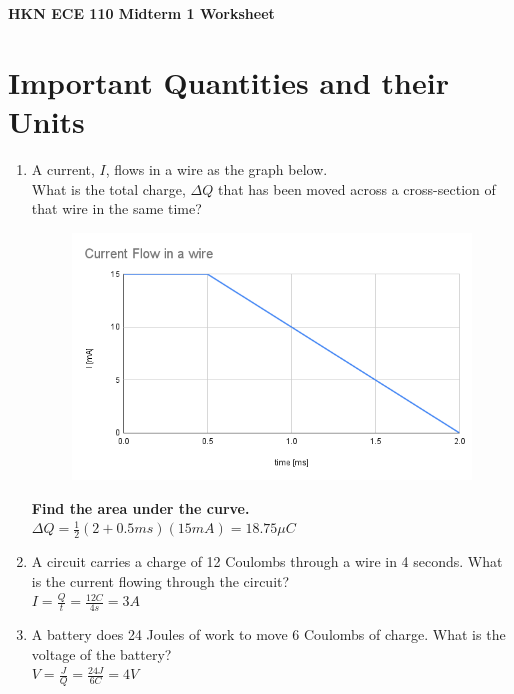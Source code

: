 \documentclass{article}
\begin{document}
\begin{center}
\textbf{
{\Large HKN ECE 110 Midterm 1 Worksheet}
} 
\end{center} 
\noindent\makebox[\linewidth]{\rule{\linewidth}{0.2pt}}

\section*{Important Quantities and their Units}
\begin{enumerate}
    \item A current, $I$, flows in a wire as the graph below.\\
    What is the total charge, $\Delta Q$ that has been moved across a cross-section of that wire in the same time?\\
    \begin{figure}[!h]
        \centering
        \includegraphics[width=1.1\textwidth]{figures/1.png}
    \end{figure}
    \textbf{Find the area under the curve. \\ $\Delta Q = \frac{1}{2}(2 + 0.5 ms)(15 mA) = 18.75 \mu C$}
    \item A circuit carries a charge of 12 Coulombs through a wire in 4 seconds. What is the current flowing through the circuit? \\
    \textbf{$I = \frac{Q}{t} = \frac{12 C}{4 s} = 3A$}\\
    \item A battery does 24 Joules of work to move 6 Coulombs of charge. What is the voltage of the battery?
    \\ \textbf{$V = \frac{J}{Q} = \frac{24 J}{6 C} = 4V$}
    \newpage
    
\end{enumerate}
\end{document}
